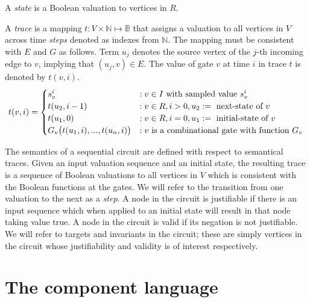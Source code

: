 \begin{definition}[State]
\rm A {\em state} is a Boolean valuation to vertices in $R$. 
\end{definition}

\begin{definition}[Trace]
\rm A {\em trace} is a mapping $t: V \times \mathbb{N} \mapsto
\mathbb{B}$ that assigns a valuation to all vertices in
$V$ across time {\em steps} denoted as indexes from
$\mathbb{N}$.  The mapping must be consistent with $E$ and
$G$ as follows.  Term $u_{j}$ denotes the source vertex of
the $j$-th incoming edge to $v$, implying that
$(u_{j},v)\in E$.  The value of gate $v$ at time $i$ in
trace $t$ is denoted by $t(v,i)$.
\[
t(v,i)=
   \begin{cases}
      s^i_{v}            &:v \in I \ \text{with sampled value $s_{v}^i$}\\
      t(u_2, i-1)        &:v \in R,i>0,u_2:=\ \text{next-state of $v$}\\
      t(u_1, 0)       &:v \in R,i=0,u_1:=\ \text{initial-state of $v$}\\
      G_v\big(t(u_{1},i),...,t(u_{n},i)\big) &: v \ \text{is a combinational gate with function 
$G_v$}
   \end{cases} \newline
\]
\end{definition}

The semantics of a sequential circuit are defined with
respect to semantical traces.  Given an input valuation
sequence and an initial state, the resulting trace is a
sequence of Boolean valuations to all vertices in $V$
which is consistent with the Boolean functions at the
gates.  We will refer to the transition from one valuation
to the next as a {\em step}.  A node in the circuit is
justifiable if there is an input sequence which when
applied to an initial state will result in that node
taking value $\mbox{true}$.  A node in the circuit is
valid if its negation is not justifiable.  We will refer
to targets and invariants in the circuit; these are simply
vertices in the circuit whose justifiability and validity
is of interest respectively.

\section{The \thislanguage component language}
\label{s:back:etc}


